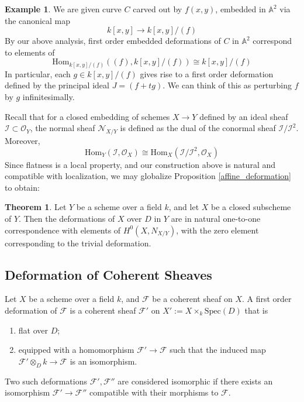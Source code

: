 \documentclass{article}
\newcommand{\Spec}{\textrm{Spec}}
\newcommand{\Hom}{\textrm{Hom}}
\theoremstyle{definition}
\newtheorem{theorem}{Theorem}[section]
\theoremstyle{definition}
\theoremstyle{definition}
\theoremstyle{definition}
\theoremstyle{definition}
\theoremstyle{definition}
\theoremstyle{definition}
\newtheorem{example}{Example}[theorem]
\begin{document}
\begin{example}
We are given curve $C$ carved out by $f(x,y)$, embedded in $\mathbb{A}^2$ via the canonical map 
	 \[k[x,y]\to k[x,y]/(f)\]
By our above analysis, first order embedded deformations of $C$ in $\mathbb{A}^2$ correspond to elements of 
\[\mathrm{Hom}_{k[x,y]/(f)} ((f), k[x,y]/(f))\cong k[x,y]/(f)\]
In particular, each $g\in k[x,y]/(f)$ gives rise to a first order deformation defined by the principal ideal $J=(f+tg)$. We can think of this as perturbing $f$ by $g$ infinitesimally.

\end{example}

Recall that for a closed embedding of schemes $X\to Y$ defined by an ideal sheaf $\mathcal{I}\subset \mathcal{O}_Y$, the normal sheaf $\mathcal{N}_{X/Y}$ is defined as the dual of the conormal sheaf $\mathcal{I}/\mathcal{I}^2$. Moreover, 
\[\Hom_Y(\mathcal{I}, \mathcal{O}_X)\cong \Hom_X(\mathcal{I}/\mathcal{I}^2, \mathcal{O}_X)\] Since flatness is a local property, and our construction above is natural and compatible with localization, we may globalize Proposition \ref{affine_deformation} to obtain:
\begin{theorem}
	Let $Y$ be a scheme over a field $k$, and let $X$ be a closed subscheme of $Y$. Then the deformations of $X$ over $D$ in $Y$ are in natural one-to-one correspondence with elements of $H^0(X,N_{X/Y})$, with the zero element corresponding to the trivial deformation.
\end{theorem}

\subsection{Deformation of Coherent Sheaves}
Let $X$ be a scheme over a field $k$, and $\mathcal{F}$ be a coherent sheaf on $X$. A first order deformation of $\mathcal{F}$ is a coherent sheaf $\mathcal{F}'$ on $X':=X\times_k \Spec(D)$ that is 
\begin{enumerate}
	\item flat over $D$;
	\item equipped with a homomorphism  $\mathcal{F'}\to \mathcal{F}$ such that the induced map $\mathcal{F}'\otimes_D k\to \mathcal{F}$ is an isomorphism.
\end{enumerate}
Two such deformations $\mathcal{F}',\mathcal{F}''$ are considered isomorphic if there exists an isomorphism $\mathcal{F}'\to \mathcal{F}''$ compatible with their morphisms to $\mathcal{F}$. 
\end{document}
